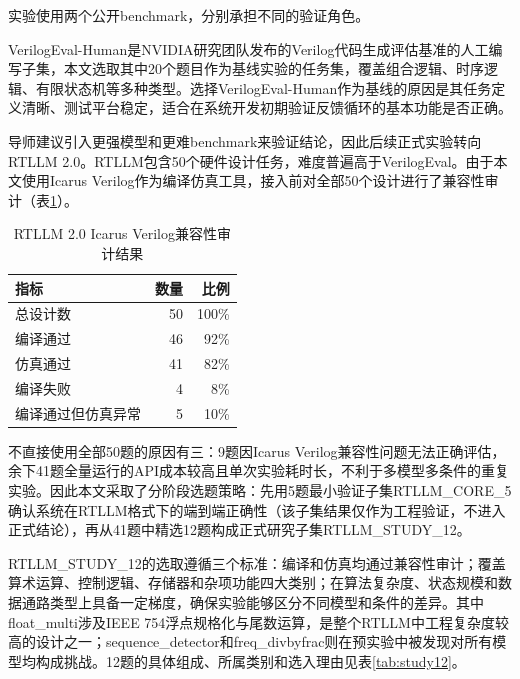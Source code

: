 实验使用两个公开benchmark，分别承担不同的验证角色。

VerilogEval-Human\cite{verilogeval}是NVIDIA研究团队发布的Verilog代码生成评估基准的人工编写子集，本文选取其中20个题目作为基线实验的任务集，覆盖组合逻辑、时序逻辑、有限状态机等多种类型。选择VerilogEval-Human作为基线的原因是其任务定义清晰、测试平台稳定，适合在系统开发初期验证反馈循环的基本功能是否正确。

导师建议引入更强模型和更难benchmark来验证结论，因此后续正式实验转向RTLLM 2.0\cite{rtllm}。RTLLM包含50个硬件设计任务，难度普遍高于VerilogEval。由于本文使用Icarus Verilog\cite{iverilog}作为编译仿真工具，接入前对全部50个设计进行了兼容性审计（表\ref{tab:rtllm_audit}）。

\begin{table}[htbp]
\centering
\caption{RTLLM 2.0 Icarus Verilog兼容性审计结果}
\label{tab:rtllm_audit}
\begin{tabular}{lrr}
\toprule
指标 & 数量 & 比例 \\
\midrule
总设计数 & 50 & 100\% \\
编译通过 & 46 & 92\% \\
仿真通过 & 41 & 82\% \\
编译失败 & 4 & 8\% \\
编译通过但仿真异常 & 5 & 10\% \\
\bottomrule
\end{tabular}
\end{table}

不直接使用全部50题的原因有三：9题因Icarus Verilog兼容性问题无法正确评估，余下41题全量运行的API成本较高且单次实验耗时长，不利于多模型多条件的重复实验。因此本文采取了分阶段选题策略：先用5题最小验证子集RTLLM\_CORE\_5确认系统在RTLLM格式下的端到端正确性（该子集结果仅作为工程验证，不进入正式结论），再从41题中精选12题构成正式研究子集RTLLM\_STUDY\_12。

RTLLM\_STUDY\_12的选取遵循三个标准：编译和仿真均通过兼容性审计；覆盖算术运算、控制逻辑、存储器和杂项功能四大类别；在算法复杂度、状态规模和数据通路类型上具备一定梯度，确保实验能够区分不同模型和条件的差异。其中float\_multi涉及IEEE 754浮点规格化与尾数运算，是整个RTLLM中工程复杂度较高的设计之一；sequence\_detector和freq\_divbyfrac则在预实验中被发现对所有模型均构成挑战。12题的具体组成、所属类别和选入理由见表\ref{tab:study12}。


